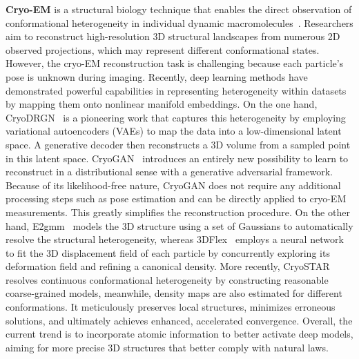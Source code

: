 \smallskip \noindent \textbf{Cryo-EM} is a structural biology technique that enables the direct observation of conformational heterogeneity in individual dynamic macromolecules~\citep{lyumkis2019challenges}. Researchers aim to reconstruct high-resolution 3D structural landscapes from numerous 2D observed projections, which may represent different conformational states. However, the cryo-EM reconstruction task is challenging because each particle's pose is unknown during imaging.
Recently, deep learning methods have demonstrated powerful capabilities in representing heterogeneity within datasets by mapping them onto nonlinear manifold embeddings. On the one hand, CryoDRGN~\citep{zhong2021cryodrgn} is a pioneering work that captures this heterogeneity by employing variational autoencoders (VAEs) to map the data into a low-dimensional latent space. A generative decoder then reconstructs a 3D volume from a sampled point in this latent space.
CryoGAN~\citep{gupta2021cryogan} introduces an entirely new possibility to learn to reconstruct in a distributional sense with a generative adversarial framework. Because of its likelihood-free nature, CryoGAN does not require any additional processing steps such as pose estimation and can be directly applied to cryo-EM measurements. This greatly simplifies the reconstruction procedure. On the other hand, E2gmm~\citep{chen2021deep} models the 3D structure using a set of Gaussians to automatically resolve the structural heterogeneity, whereas 3DFlex~\citep{punjani20233dflex} employs a neural network to fit the 3D displacement field of each particle by concurrently exploring its deformation field and refining a canonical density. More recently, CryoSTAR~\citep{li2024cryostar} resolves continuous conformational heterogeneity by constructing reasonable coarse-grained models, meanwhile, density maps are also estimated for different conformations. It meticulously preserves local structures, minimizes erroneous solutions, and ultimately achieves enhanced, accelerated convergence. Overall, the current trend is to incorporate atomic information to better activate deep models, aiming for more precise 3D structures that better comply with natural laws.

